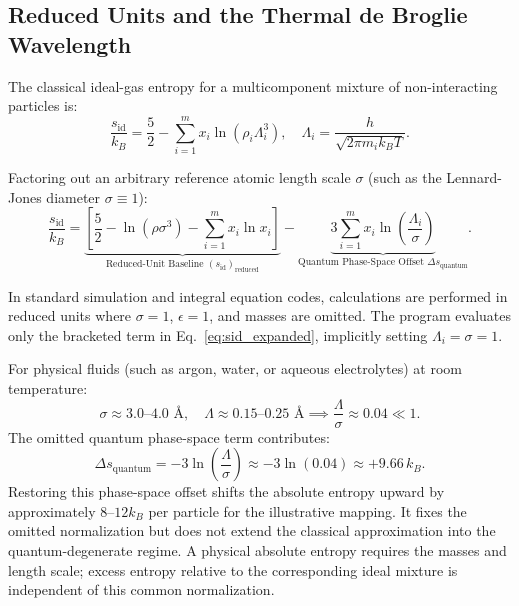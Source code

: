 \documentclass[11pt,a4paper]{article}
\begin{document}
\subsection{Reduced Units and the Thermal de Broglie Wavelength}

The classical ideal-gas entropy for a multicomponent mixture of non-interacting particles is:
\begin{equation}
\label{eq:sackur_tetrode}
\frac{s_{\text{id}}}{k_B} = \frac{5}{2} - \sum_{i=1}^{m} x_i \ln\left( \rho_i \Lambda_i^3 \right), \quad \Lambda_i = \frac{h}{\sqrt{2\pi m_i k_B T}}.
\end{equation}

Factoring out an arbitrary reference atomic length scale $\sigma$ (such as the Lennard-Jones diameter $\sigma \equiv 1$):
\begin{equation}
\label{eq:sid_expanded}
\frac{s_{\text{id}}}{k_B} = \underbrace{\left[ \frac{5}{2} - \ln(\rho \sigma^3) - \sum_{i=1}^{m} x_i \ln x_i \right]}_{\text{Reduced-Unit Baseline } (s_{\text{id}})_{\text{reduced}}} - \underbrace{3 \sum_{i=1}^{m} x_i \ln\left( \frac{\Lambda_i}{\sigma} \right)}_{\text{Quantum Phase-Space Offset } \Delta s_{\text{quantum}}}.
\end{equation}

In standard simulation and integral equation codes, calculations are performed in reduced units where $\sigma=1$, $\epsilon=1$, and masses are omitted. The program evaluates only the bracketed term in Eq.~\eqref{eq:sid_expanded}, implicitly setting $\Lambda_i = \sigma = 1$.

For physical fluids (such as argon, water, or aqueous electrolytes) at room temperature:
\begin{equation}
\sigma \approx 3.0\text{--}4.0\text{ \AA}, \quad \Lambda \approx 0.15\text{--}0.25\text{ \AA} \implies \frac{\Lambda}{\sigma} \approx 0.04 \ll 1.
\end{equation}
The omitted quantum phase-space term contributes:
\begin{equation}
\Delta s_{\text{quantum}} = -3 \ln\left( \frac{\Lambda}{\sigma} \right) \approx -3 \ln(0.04) \approx +9.66 \, k_B.
\end{equation}
Restoring this phase-space offset shifts the absolute entropy upward by approximately $8$--$12k_B$ per particle for the illustrative mapping. It fixes the omitted normalization but does not extend the classical approximation into the quantum-degenerate regime. A physical absolute entropy requires the masses and length scale; excess entropy relative to the corresponding ideal mixture is independent of this common normalization.
\end{document}
